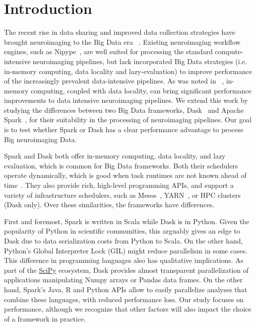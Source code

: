 \documentclass[conference]{IEEEtran}
\begin{document}
\section{Introduction}
The recent rise in data sharing and improved data collection strategies
have brought neuroimaging to the Big Data era ~\cite{ALFAROALMAGRO:18,
van2014human}. Existing neuroimaging workflow engines, such as
Nipype~\cite{Nipype:11}, are well suited for processing the standard
compute-intensive neuroimaging pipelines, but lack incorporated Big Data
strategies (i.e. in-memory computing, data locality and lazy-evaluation) to
improve performance of the increasingly prevalent data-intensive pipelines.
As was noted in ~\cite{hayot2019performance}, in-memory computing, coupled
with data locality, can bring significant performance improvements to data
intensive neuroimaging pipelines. We extend this work by studying the
differences between two Big Data frameworks, Dask~\cite{Dask:15} and Apache
Spark~\cite{Spark:16}, for their suitability in the processing of neuroimaging
pipelines. Our goal is to test whether Spark or Dask has a clear
performance advantage to process Big neuroimaging Data. 

Spark and Dask both offer in-memory computing, data locality, and lazy evaluation,
which is common for Big Data frameworks. Both their schedulers operate dynamically,
which is good when task runtimes are not known ahead of time~\cite{Dask:15}. They
also provide rich, high-level programming APIs, and support a variety of
infrastructure schedulers, such as Mesos~\cite{hindman2011mesos}, YARN~\cite{vavilapalli2013apache}, or HPC clusters (Dask only). Over
these similarities, the frameworks have differences.

First and foremost, Spark is written in Scala while Dask is in Python.
Given the popularity of Python in scientific communities, this arguably
gives an edge to Dask due to data serialization costs from Python to Scala.
On the other hand, Python's Global Interpreter Lock (GIL) might reduce
parallelism in some cases. This difference in programming languages also
has qualitative implications. As part of the \href{http://scipy.org}{SciPy}
ecosystem, Dask provides almost transparent parallelization of applications
manipulating Numpy arrays or Pandas data frames. On the other hand, Spark's
Java, R and Python APIs allow to easily parallelize analyses that combine
these languages, with reduced performance loss. Our study focuses on
performance, although we recognize that other factors will also impact the
choice of a framework in practice.
\end{document}
